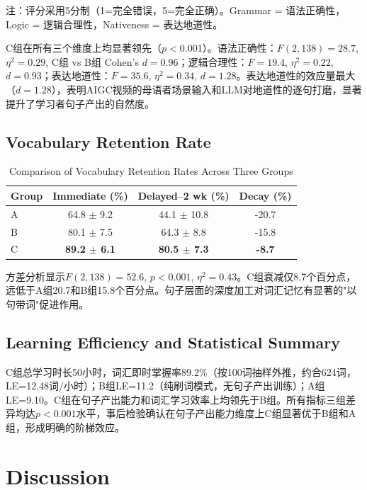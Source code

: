\documentclass[Afour,sageapa,times]{sagej}
\begin{document}
注：评分采用5分制（1=完全错误，5=完全正确）。Grammar = 语法正确性，Logic = 逻辑合理性，Nativeness = 表达地道性。

C组在所有三个维度上均显著领先（$p<0.001$）。语法正确性：$F(2,138)=28.7$, $\eta^2=0.29$, C组 vs B组 Cohen's $d=0.96$；逻辑合理性：$F=19.4$, $\eta^2=0.22$, $d=0.93$；表达地道性：$F=35.6$, $\eta^2=0.34$, $d=1.28$。表达地道性的效应量最大（$d=1.28$），表明AIGC视频的母语者场景输入和LLM对地道性的逐句打磨，显著提升了学习者句子产出的自然度。

\subsection{Vocabulary Retention Rate}

\begin{table}[H]
\centering
\small
\caption{Comparison of Vocabulary Retention Rates Across Three Groups}
\begin{tabular}{lccc}
\toprule
\textbf{Group} & \textbf{Immediate (\%)} & \textbf{Delayed--2 wk (\%)} & \textbf{Decay (\%)} \\
\midrule
A & 64.8 $\pm$ 9.2 & 44.1 $\pm$ 10.8 & -20.7 \\
B & 80.1 $\pm$ 7.5 & 64.3 $\pm$ 8.8 & -15.8 \\
C & \textbf{89.2 $\pm$ 6.1} & \textbf{80.5 $\pm$ 7.3} & \textbf{-8.7} \\
\bottomrule
\end{tabular}
\end{table}

方差分析显示$F(2,138)=52.6$, $p<0.001$, $\eta^2=0.43$。C组衰减仅8.7个百分点，远低于A组20.7和B组15.8个百分点。句子层面的深度加工对词汇记忆有显著的"以句带词"促进作用。

\subsection{Learning Efficiency and Statistical Summary}
C组总学习时长50小时，词汇即时掌握率89.2\%（按100词抽样外推，约合624词，LE=12.48词/小时）；B组LE=11.2（纯刷词模式，无句子产出训练）；A组LE=9.10。C组在句子产出能力和词汇学习效率上均领先于B组。所有指标三组差异均达$p<0.001$水平，事后检验确认在句子产出能力维度上C组显著优于B组和A组，形成明确的阶梯效应。


\section{Discussion}  %
\end{document}
